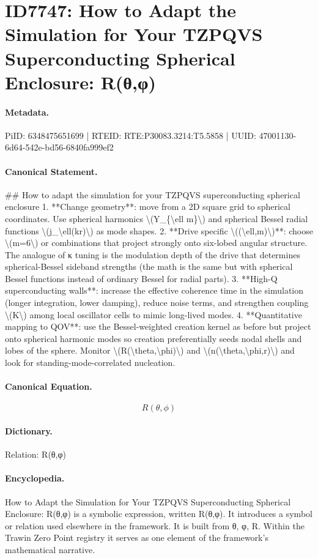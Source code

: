 \section*{ID7747: How to Adapt the Simulation for Your TZPQVS Superconducting Spherical Enclosure: R(θ,φ)}
\paragraph{Metadata.}
PiID: 6348475651699 | RTEID: RTE:P30083.3214:T5.5858 | UUID: 47001130-6d64-542e-bd56-6840fa999ef2

\paragraph{Canonical Statement.}
\#\# How to adapt the simulation for your TZPQVS superconducting spherical enclosure 1. **Change geometry**: move from a 2D square grid to spherical coordinates. Use spherical harmonics \textbackslash{}(Y\_\{\textbackslash{}ell m\}\textbackslash{}) and spherical Bessel radial functions \textbackslash{}(j\_\textbackslash{}ell(kr)\textbackslash{}) as mode shapes. 2. **Drive specific \textbackslash{}((\textbackslash{}ell,m)\textbackslash{})**: choose \textbackslash{}(m=6\textbackslash{}) or combinations that project strongly onto six-lobed angular structure. The analogue of κ tuning is the modulation depth of the drive that determines spherical-Bessel sideband strengths (the math is the same but with spherical Bessel functions instead of ordinary Bessel for radial parts). 3. **High-Q superconducting walls**: increase the effective coherence time in the simulation (longer integration, lower damping), reduce noise terms, and strengthen coupling \textbackslash{}(K\textbackslash{}) among local oscillator cells to mimic long-lived modes. 4. **Quantitative mapping to QOV**: use the Bessel-weighted creation kernel as before but project onto spherical harmonic modes so creation preferentially seeds nodal shells and lobes of the sphere. Monitor \textbackslash{}(R(\textbackslash{}theta,\textbackslash{}phi)\textbackslash{}) and \textbackslash{}(n(\textbackslash{}theta,\textbackslash{}phi,r)\textbackslash{}) and look for standing-mode-correlated nucleation.

\paragraph{Canonical Equation.}
\[
R(\theta,\phi)
\]

\paragraph{Dictionary.}
Relation: R(θ,φ)

\paragraph{Encyclopedia.}
How to Adapt the Simulation for Your TZPQVS Superconducting Spherical Enclosure: R(θ,φ) is a symbolic expression, written R(θ,φ). It introduces a symbol or relation used elsewhere in the framework. It is built from θ, φ, R. Within the Trawin Zero Point registry it serves as one element of the framework's mathematical narrative.
